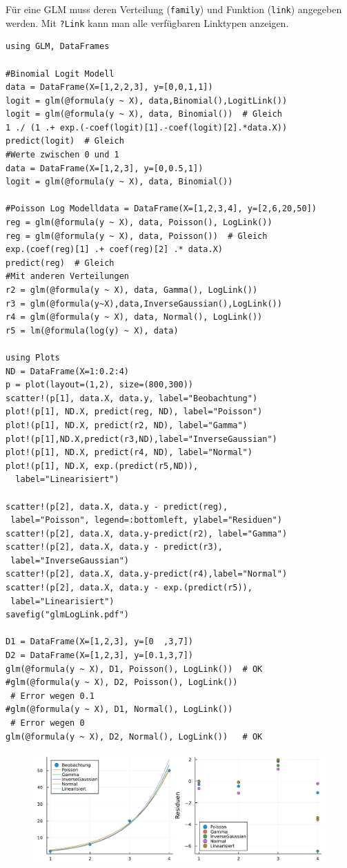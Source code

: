 \documentclass[10pt,twocolumn]{scrartcl}
\begin{document}
Für eine GLM muss deren Verteilung (\lstinline|family|) und Funktion
(\lstinline|link|) angegeben werden. Mit \lstinline|?Link| kann man alle verfügbaren Linktypen anzeigen.

\begin{lstlisting}
using GLM, DataFrames

#Binomial Logit Modell
data = DataFrame(X=[1,2,2,3], y=[0,0,1,1])
logit = glm(@formula(y ~ X), data,Binomial(),LogitLink())
logit = glm(@formula(y ~ X), data, Binomial())  # Gleich
1 ./ (1 .+ exp.(-coef(logit)[1].-coef(logit)[2].*data.X))
predict(logit)  # Gleich
#Werte zwischen 0 und 1
data = DataFrame(X=[1,2,3], y=[0,0.5,1])
logit = glm(@formula(y ~ X), data, Binomial())

#Poisson Log Modelldata = DataFrame(X=[1,2,3,4], y=[2,6,20,50])
reg = glm(@formula(y ~ X), data, Poisson(), LogLink())
reg = glm(@formula(y ~ X), data, Poisson())  # Gleich
exp.(coef(reg)[1] .+ coef(reg)[2] .* data.X)
predict(reg)  # Gleich
#Mit anderen Verteilungen
r2 = glm(@formula(y ~ X), data, Gamma(), LogLink())
r3 = glm(@formula(y~X),data,InverseGaussian(),LogLink())
r4 = glm(@formula(y ~ X), data, Normal(), LogLink())
r5 = lm(@formula(log(y) ~ X), data)

using Plots
ND = DataFrame(X=1:0.2:4)
p = plot(layout=(1,2), size=(800,300))
scatter!(p[1], data.X, data.y, label="Beobachtung")
plot!(p[1], ND.X, predict(reg, ND), label="Poisson")
plot!(p[1], ND.X, predict(r2, ND), label="Gamma")
plot!(p[1],ND.X,predict(r3,ND),label="InverseGaussian")
plot!(p[1], ND.X, predict(r4, ND), label="Normal")
plot!(p[1], ND.X, exp.(predict(r5,ND)),
  label="Linearisiert")

scatter!(p[2], data.X, data.y - predict(reg),
 label="Poisson", legend=:bottomleft, ylabel="Residuen")
scatter!(p[2], data.X, data.y-predict(r2), label="Gamma")
scatter!(p[2], data.X, data.y - predict(r3),
 label="InverseGaussian")
scatter!(p[2], data.X, data.y-predict(r4),label="Normal")
scatter!(p[2], data.X, data.y - exp.(predict(r5)),
 label="Linearisiert")
savefig("glmLogLink.pdf")

D1 = DataFrame(X=[1,2,3], y=[0  ,3,7])
D2 = DataFrame(X=[1,2,3], y=[0.1,3,7])
glm(@formula(y ~ X), D1, Poisson(), LogLink())  # OK
#glm(@formula(y ~ X), D2, Poisson(), LogLink())
 # Error wegen 0.1
#glm(@formula(y ~ X), D1, Normal(), LogLink())
 # Error wegen 0
glm(@formula(y ~ X), D2, Normal(), LogLink())   # OK
\end{lstlisting}

\begin{figure}[h]
  \centering
  \includegraphics[width=.95\columnwidth]{glmLogLink.pdf}
\end{figure}
\end{document}
